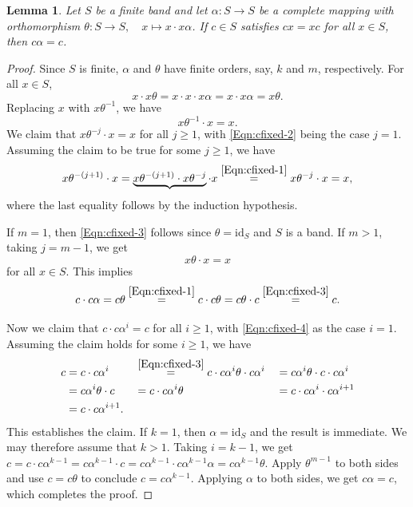 \documentclass[11pt]{article}
\theoremstyle{plain}
\newtheorem{lemma}[theorem]{Lemma}
\theoremstyle{remark}
\theoremstyle{definition}
\theoremstyle{plain}
\newcommand{\byeqn}[1]{\overset{\eqref{#1}}{=}}
\newcommand{\idmap}{\mathrm{id}}
\newcommand{\inv}{^{-1}}
\begin{document}
\begin{lemma}\label{Lem:cfixed}
    Let $S$ be a finite band and let $\alpha\colon S\to S$ be a complete mapping with orthomorphism $\theta\colon S\to S,\quad x\mapsto x\cdot x\alpha$. If $c\in S$ satisfies $cx = xc$ for all $x\in S$, then $c\alpha = c$.
\end{lemma}
\begin{proof}
    Since $S$ is finite, $\alpha$ and $\theta$ have finite orders, say, $k$ and $m$, respectively. For all $x\in S$,
    \begin{equation}\label{Eqn:cfixed-1}
        x\cdot x\theta = x\cdot x\cdot x\alpha = x\cdot x\alpha = x\theta.
    \end{equation}
    Replacing $x$ with $x\theta\inv$, we have
    \begin{equation}\label{Eqn:cfixed-2}
        x\theta\inv\cdot x = x.
    \end{equation}
    We claim that $x\theta^{-j}\cdot x = x$ for all $j\ge 1$, with \eqref{Eqn:cfixed-2} being the case $j=1$. Assuming the claim to be true for some $j\ge 1$, we have
    \[
    x\theta^{-(j+1)}\cdot x =
    \underbrace{x\theta^{-(j+1)}\cdot x\theta^{-j}}\cdot x \byeqn{Eqn:cfixed-1}
    x\theta^{-j}\cdot x = x,
    \]
    where the last equality follows by the induction hypothesis.

    If $m=1$, then \eqref{Eqn:cfixed-3} follows since $\theta=\idmap_S$ and $S$ is a band. If $m>1$, taking $j = m-1$, we get
    \begin{equation}\label{Eqn:cfixed-3}
        x\theta\cdot x = x
    \end{equation}
    for all $x\in S$. This implies
    \begin{equation}\label{Eqn:cfixed-4}
        c\cdot c\alpha = c\theta \byeqn{Eqn:cfixed-1}
        c\cdot c\theta = c\theta\cdot c \byeqn{Eqn:cfixed-3} c.
    \end{equation}

    Now we claim that $c\cdot c\alpha^i = c$ for all $i\ge 1$, with
    \eqref{Eqn:cfixed-4} as the case $i=1$. Assuming the claim holds for some $i\ge 1$, we have
    \begin{alignat*}{3}
        c &= c\cdot c\alpha^i &&\byeqn{Eqn:cfixed-3} c\cdot c\alpha^i\theta\cdot c\alpha^i &&= c\alpha^i\theta\cdot c\cdot c\alpha^i \\
        &= c\alpha^i\theta\cdot c &&= c\cdot c\alpha^i\theta &&= c\cdot c\alpha^i\cdot c\alpha^{i+1}\\
        &= c\cdot c\alpha^{i+1}. && &&
    \end{alignat*}
    This establishes the claim. If $k=1$, then $\alpha=\idmap_S$ and the result is immediate. We may therefore assume that $k>1$. Taking $i=k-1$, we get
    \(c=c\cdot c\alpha^{k-1}=c\alpha^{k-1}\cdot c=c\alpha^{k-1}\cdot c\alpha^{k-1}\alpha=c\alpha^{k-1}\theta.\)
    Apply $\theta^{m-1}$ to both sides and use $c = c\theta$ to conclude
    $c = c\alpha^{k-1}$. Applying $\alpha$ to both sides, we get $c\alpha = c$, which completes the proof.
\end{proof}
\end{document}
